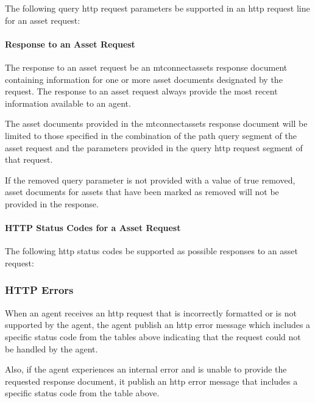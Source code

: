 The following \gls{query http request} parameters \MUST be supported in an \gls{http request line} for an \gls{asset request}:



\paragraph{Response to an Asset Request}\mbox{}

The \gls{response} to an \gls{asset request} \SHOULD be an \gls{mtconnectassets response document} containing information for one or more \glspl{asset document} designated by the \gls{request}.  
The \gls{response} to an \gls{asset request} \MUST always provide the most recent information available to an \gls{agent}.

The \glspl{asset document} provided in the \gls{mtconnectassets response document} will be limited to those specified in the combination of the \gls{path query} segment of the \gls{asset request} and the parameters provided in the \gls{query http request} segment of that \gls{request}.

If the \gls{removed} query parameter is not provided with a value of \gls{true removed}, \glspl{asset document} for \glspl{asset} that have been marked as removed will not be provided in the response. 

\paragraph{HTTP Status Codes for a Asset Request}\mbox{}

The following \glspl{http status code} \MUST be supported as possible responses to an \gls{asset request}:



\subsubsection{HTTP Errors}

When an \gls{agent} receives an \gls{http request} that is incorrectly formatted or is not supported by the \gls{agent}, the \gls{agent} \MUST publish an \gls{http error message} which includes a specific status code from the tables above indicating that the \gls{request} could not be handled by the \gls{agent}.

Also, if the \gls{agent} experiences an internal error and is unable to provide the requested \gls{response document}, it \MUST publish an \gls{http error message} that includes a specific status code from the table above.

